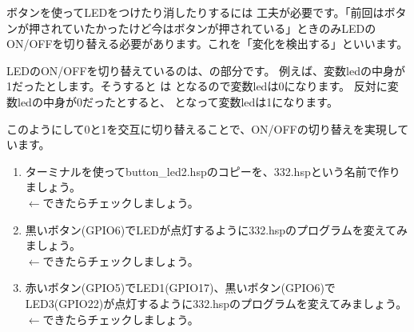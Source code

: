 ボタンを使ってLEDをつけたり消したりするには 工夫が必要です。「前回はボタンが押されていたかったけど今はボタンが押されている」ときのみLEDのON/OFFを切り替える必要があります。これを「変化を検出する」といいます。

LEDのON/OFFを切り替えているのは、の部分です。
例えば、変数ledの中身が1だったとします。そうすると は となるので変数ledは0になります。
反対に変数ledの中身が0だったとすると、 となって変数ledは1になります。

このようにして0と1を交互に切り替えることで、ON/OFFの切り替えを実現しています。\\

\begin{tcolorbox}[title=\useOmetoi]
\label{button_led2_toi}
\begin{enumerate}
\item ターミナルを使ってbutton\_led2.hspのコピーを、332.hspという名前で作りましょう。\\
\fbox{\phantom{白}} $\leftarrow$できたらチェックしましょう。
\item 黒いボタン(GPIO6)でLEDが点灯するように332.hspのプログラムを変えてみましょう。\\
\fbox{\phantom{白}} $\leftarrow$できたらチェックしましょう。
\item 赤いボタン(GPIO5)でLED1(GPIO17)、黒いボタン(GPIO6)でLED3(GPIO22)が点灯するように332.hspのプログラムを変えてみましょう。\\
\fbox{\phantom{白}} $\leftarrow$できたらチェックしましょう。
\end{enumerate}
\end{tcolorbox}